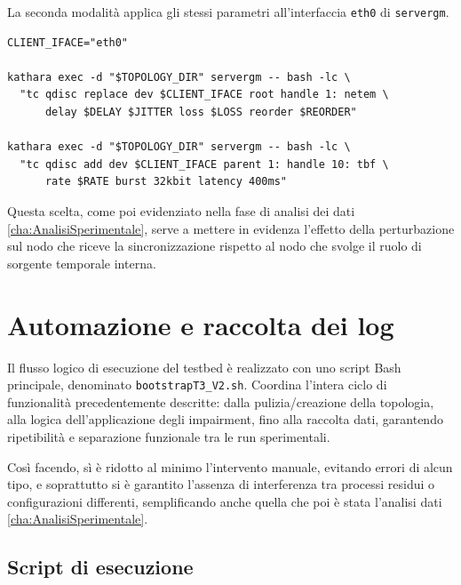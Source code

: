 La seconda modalità applica gli stessi parametri all'interfaccia \texttt{eth0} di
\texttt{servergm}.

\begin{listing}[H]
\begin{verbatim}
CLIENT_IFACE="eth0"

kathara exec -d "$TOPOLOGY_DIR" servergm -- bash -lc \
  "tc qdisc replace dev $CLIENT_IFACE root handle 1: netem \
      delay $DELAY $JITTER loss $LOSS reorder $REORDER"

kathara exec -d "$TOPOLOGY_DIR" servergm -- bash -lc \
  "tc qdisc add dev $CLIENT_IFACE parent 1: handle 10: tbf \
      rate $RATE burst 32kbit latency 400ms"
\end{verbatim}
\caption{Applicazione di netem e tbf su servergm:eth0.}
\label{lst:tc-servergm}
\end{listing}

Questa scelta, come poi evidenziato nella fase di analisi dei dati
\ref{cha:AnalisiSperimentale}, serve a mettere in evidenza l'effetto della perturbazione
sul nodo che riceve la sincronizzazione rispetto al nodo che svolge il ruolo di sorgente
temporale interna.

\section{Automazione e raccolta dei log}

\begin{sloppypar}
  Il flusso logico di esecuzione del testbed è realizzato con uno script Bash
  principale, denominato \texttt{bootstrapT3\_V2.sh}. Coordina l'intera ciclo di funzionalità
  precedentemente descritte: dalla pulizia/creazione della topologia, alla logica dell'applicazione
  degli impairment, fino alla raccolta dati, garantendo ripetibilità e separazione funzionale
  tra le run sperimentali.
\end{sloppypar}

Così facendo, sì è ridotto al minimo l'intervento manuale, evitando errori di alcun
tipo, e soprattutto si è garantito l'assenza di interferenza tra processi residui o
configurazioni differenti, semplificando anche quella che poi è stata l'analisi dati
\ref{cha:AnalisiSperimentale}.

\subsection{Script di esecuzione}

